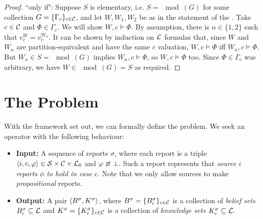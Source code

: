 \begin{proof}
    ``only if": Suppose $S$ is elementary, i.e. $S = \mod(G)$ for some
    collection $G = \{\Gamma_c\}_{c \in \mathcal{C}}$, and let $W, W_1, W_2$ be as in
    the statement of the . Take $c
    \in \mathcal{C}$ and $\Phi \in \Gamma_c$. We will show $W, c \models \Phi$. By assumption,
    there is $n \in \{1, 2\}$ such that $v^W_c = v^{W_n}_c$. It can be shown by
    induction on $\mathcal{L}{}$ formulas that, since $W$ and $W_n$ are
    partition-equivalent and have the same $c$ valuation, $W, c \models \Phi$ iff
    $W_n, c \models \Phi$. But $W_n \in S = \mod(G)$ implies $W_n, c \models
    \Phi$,
    so $W, c \models \Phi$ too.  Since $\Phi \in \Gamma_c$ was arbitrary, we have $W
    \in \mod(G) = S$ as required.

\end{proof}

\section{The Problem}
\label{sec:the_problem}

With the framework set out, we can formally define the problem. We
seek an operator with the following behaviour:

\begin{itemize}

\item \textbf{Input:} A sequence of reports $\sigma$, where each report is a
      triple $\langle {i, c, \varphi} \rangle \in \mathcal{S} \times \mathcal{C} \times \mathcal{L}{}_0$ and $\varphi
      \not\equiv \bot$. Such a report represents that {\em source $i$
      reports $\phi$ to hold in case $c$}. Note that we only allow sources to
      make \emph{propositional} reports.

\item \textbf{Output:} A pair $\langle {B^\sigma, K^\sigma} \rangle$, where $B^\sigma =
      \{B^\sigma_c\}_{c \in \mathcal{C}}$ is a collection of \emph{belief sets}
      $B^\sigma_c \subseteq \mathcal{L}{}$ and $K^\sigma = \{K^\sigma_c\}_{c \in \mathcal{C}}$
      is a collection of \emph{knowledge sets} $K^\sigma_c \subseteq \mathcal{L}{}$.

\end{itemize}


